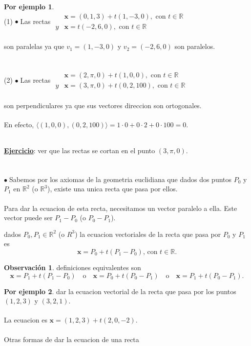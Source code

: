 \documentclass{article}
\theoremstyle{definition}
\theoremstyle{definition}
\newtheorem*{obs}{Observación}
\newtheorem*{ej}{Por ejemplo}
\theoremstyle{remark}
\newcommand\R{\ensuremath{\mathbb{R}}}
\newcommand\bl{$\bullet\;$}
\begin{document}
\begin{ej}
  \; \\
  (1) \quad \bl Las rectas  $\begin{array}{ll}
   &  \mathbf{x}=(0,1,3)+t(1,-3,0), \text{ con } t \in \mathbb{R} \\
    y & \mathbf{x}=t(-2,6,0), \text{ con } t \in \mathbb{R}
  \end{array}$\\\\ son paralelas ya que $v_1= (1,-3,0)$ y $v_2=(-2,6,0)$ son paralelos. \\\\\\
  (2) \quad \bl Las rectas $\begin{array}{ll}
   &  \mathbf{x}=(2,\pi,0)+t(1,0,0), \text{ con } t \in \mathbb{R} \\
    y & \mathbf{x}=(3,\pi,0)+t(0,2,100), \text{ con } t \in \mathbb{R}
  \end{array}$ \\ \\  son perpendiculares ya que sus vectores direccion son ortogonales. \\\\ En efecto, $\langle(1,0,0),(0,2,100) \rangle = 1 \cdot 0 + 0 \cdot 2 + 0 \cdot 100 = 0. $
\end{ej}
\; \\
\underline{\textbf{Ejercicio}}: ver que las rectas se cortan en el punto $(3,\pi,0)$.
\\\\\\
\bl Sabemos por los axiomas de la geometria euclidiana que dados dos puntos $P_0$ y $P_1$ en $\mathbb{R}^2$ (o $\R^3$), existe una unica recta que pasa por ellos. \\\\Para dar la ecuacion de esta recta, necesitamos un vector paralelo a ella. Este vector puede ser $P_1-P_0$ (o $P_0-P_1$). 
\begin{defi}
  dados $P_0,P_1 \in \R^2$ (o $R^3$) la ecuacion vectoriales de la recta que pasa por $P_0$ y $P_1$ es \[
    \mathbf{x}=P_0+t(P_1-P_0) \text{, con } t \in \mathbb{R}.
  \]
\end{defi}
\begin{figure}[h]
\centering
\def\svgwidth{0.55\textwidth}

\end{figure}

\begin{obs}
  definiciones equivalentes son \[
    \mathbf{x} = P_1+t(P_1-P_0) \quad \text{o} \quad \mathbf{x}=P_0+t(P_0-P_1) \quad \text{o} \quad \mathbf{x}=P_1+t(P_0-P_1).
  \]
\end{obs}
\begin{ej}
  dar la ecuacion vectorial de la recta que pasa por los puntos $(1,2,3)$ y $(3,2,1)$. \\ \\ 
  La ecuacion es \quad $\mathbf{x}=(1,2,3)+t(2,0,-2)$. \\\\
  Otras formas de dar la ecuacion de una recta 
\end{ej}
\end{document}
